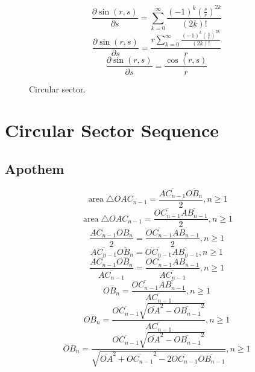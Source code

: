 \documentclass[a4paper,12pt]{report}
\DeclareMathOperator{\area}{area}
\begin{document}
\begin{equation}
\frac{\partial \sin(r,s)}{\partial s} = \sum \limits_{k=0}^{\infty} \frac{(-1)^k \left(\frac{s}{r}\right)^{2k}}{(2k)!}
\end{equation}
\begin{equation}
\frac{\partial \sin(r,s)}{\partial s} = \frac{r \sum \limits_{k=0}^{\infty} \frac{(-1)^k \left(\frac{s}{r}\right)^{2k}}{(2k)!}}{r}
\end{equation}
\begin{equation}
\frac{\partial \sin(r,s)}{\partial s} = \frac{\cos(r,s)}{r}
\end{equation}
\clearpage
\begin{figure}[p]
\centering
\resizebox{\textwidth}{!}{}
\caption{Circular sector.}
\end{figure}
\clearpage
\section{Circular Sector Sequence}
\subsection{Apothem}
\begin{equation}
\area \triangle OAC_{n-1} = \frac{\overline{AC_{n-1}} \overline{OB_n}}{2}, n \geq 1
\end{equation}
\begin{equation}
\area \triangle OAC_{n-1} = \frac{\overline{OC_{n-1}} \overline{AB_{n-1}}}{2}, n \geq 1
\end{equation}
\begin{equation}
\frac{\overline{AC_{n-1}} \overline{OB_n}}{2} = \frac{\overline{OC_{n-1}} \overline{AB_{n-1}}}{2}, n \geq 1
\end{equation}
\begin{equation}
\overline{AC_{n-1}} \overline{OB_n} = \overline{OC_{n-1}} \overline{AB_{n-1}}, n \geq 1
\end{equation}
\begin{equation}
\frac{\overline{AC_{n-1}} \overline{OB_n}}{\overline{AC_{n-1}}} = \frac{\overline{OC_{n-1}} \overline{AB_{n-1}}}{\overline{AC_{n-1}}}, n \geq 1
\end{equation}
\begin{equation}
\overline{OB_n} = \frac{\overline{OC_{n-1}} \overline{AB_{n-1}}}{\overline{AC_{n-1}}}, n \geq 1
\end{equation}
\begin{equation}
\overline{OB_n} = \frac{\overline{OC_{n-1}} \sqrt{\overline{OA}^2 - \overline{OB_{n-1}}^2}}{\overline{AC_{n-1}}}, n \geq 1
\end{equation}
\begin{equation}
\overline{OB_n} = \frac{\overline{OC_{n-1}} \sqrt{\overline{OA}^2 - \overline{OB_{n-1}}^2}}{\sqrt{\overline{OA}^2 + \overline{OC_{n-1}}^2 - 2 \overline{OC_{n-1}} \overline{OB_{n-1}}}}, n \geq 1
\end{equation}
\end{document}
